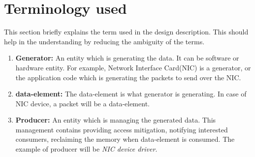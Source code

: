 \documentclass[a4paper,twoside]{report} %
\begin{document}
\section{Terminology used}
This section briefly explains the term used in the design 
description.  This should help in the understanding by reducing 
the ambiguity of the terms.
\begin{enumerate}
  \item \textbf{Generator:} An entity which is generating the data.  It
  can be software or hardware entity.  For example, Network
  Interface Card(NIC) is a generator, or the application code
  which is generating the packets to send over the NIC.
  \item \textbf{data-element:} The data-element is what generator 
  is generating. In case of NIC device, a packet will be a
  data-element.
  \item \textbf{Producer:} An entity which is managing the generated data.
  This management contains providing access mitigation, notifying
  interested consumers, reclaiming the memory when data-element
  is consumed.  The example of producer will be \textit{NIC device
  driver}.  



\end{enumerate}
\end{document}
